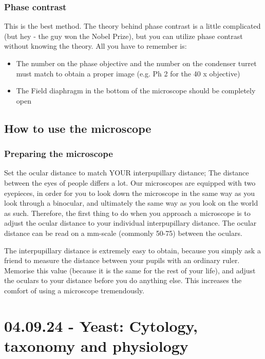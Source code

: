\subsubsection*{Phase contrast}
This is the best method. The theory behind phase contrast is a little complicated (but hey - the guy won the Nobel Prize), but you can utilize phase contrast without knowing the theory. All you have to remember is:

\begin{highlight}
    \begin{itemize}
        \item The number on the phase objective and the number on the condenser turret must match to obtain a proper image (e.g. Ph 2 for the 40 x objective)
        \item The Field diaphragm in the bottom of the microscope should be completely open
    \end{itemize}
\end{highlight}

\subsection{How to use the microscope}

\subsubsection*{Preparing the microscope}
Set the ocular distance to match YOUR interpupillary distance; The distance between the eyes of people differs a lot. Our microscopes are equipped with two eyepieces, in order for you to look down the microscope in the same way as you look through a binocular, and ultimately the same way as you look on the world as such. Therefore, the first thing to do when you approach a microscope is to adjust the ocular distance to your individual interpupillary distance. The ocular distance can be read on a mm-scale (commonly 50-75) between the oculars.

The interpupillary distance is extremely easy to obtain, because you simply ask a friend to measure the distance between your pupils with an ordinary ruler. Memorise this value (because it is the same for the rest of your life), and adjust the oculars to your distance before you do anything else. This increases the comfort of using a microscope tremendously.

\section{04.09.24 - Yeast: Cytology, taxonomy and physiology}

